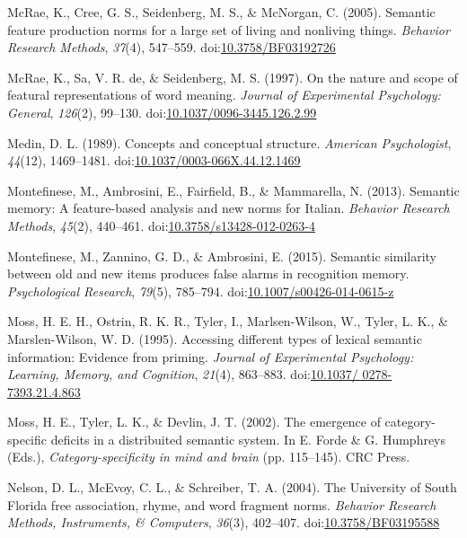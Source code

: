 \documentclass[english,,man]{apa6}
\theoremstyle{definition}
\theoremstyle{definition}
\theoremstyle{definition}
\theoremstyle{remark}
\begin{document}
\leavevmode\hypertarget{ref-McRae2005}{}%
McRae, K., Cree, G. S., Seidenberg, M. S., \& McNorgan, C. (2005).
Semantic feature production norms for a large set of living and
nonliving things. \emph{Behavior Research Methods}, \emph{37}(4),
547--559.
doi:\href{https://doi.org/10.3758/BF03192726}{10.3758/BF03192726}

\leavevmode\hypertarget{ref-McRae1997}{}%
McRae, K., Sa, V. R. de, \& Seidenberg, M. S. (1997). On the nature and
scope of featural representations of word meaning. \emph{Journal of
Experimental Psychology: General}, \emph{126}(2), 99--130.
doi:\href{https://doi.org/10.1037/0096-3445.126.2.99}{10.1037/0096-3445.126.2.99}

\leavevmode\hypertarget{ref-Medin1989}{}%
Medin, D. L. (1989). Concepts and conceptual structure. \emph{American
Psychologist}, \emph{44}(12), 1469--1481.
doi:\href{https://doi.org/10.1037/0003-066X.44.12.1469}{10.1037/0003-066X.44.12.1469}

\leavevmode\hypertarget{ref-Montefinese2013}{}%
Montefinese, M., Ambrosini, E., Fairfield, B., \& Mammarella, N. (2013).
Semantic memory: A feature-based analysis and new norms for Italian.
\emph{Behavior Research Methods}, \emph{45}(2), 440--461.
doi:\href{https://doi.org/10.3758/s13428-012-0263-4}{10.3758/s13428-012-0263-4}

\leavevmode\hypertarget{ref-Montefinese2015}{}%
Montefinese, M., Zannino, G. D., \& Ambrosini, E. (2015). Semantic
similarity between old and new items produces false alarms in
recognition memory. \emph{Psychological Research}, \emph{79}(5),
785--794.
doi:\href{https://doi.org/10.1007/s00426-014-0615-z}{10.1007/s00426-014-0615-z}

\leavevmode\hypertarget{ref-Moss1995}{}%
Moss, H. E. H., Ostrin, R. K. R., Tyler, I., Marlsen-Wilson, W., Tyler,
L. K., \& Marslen-Wilson, W. D. (1995). Accessing different types of
lexical semantic information: Evidence from priming. \emph{Journal of
Experimental Psychology: Learning, Memory, and Cognition}, \emph{21}(4),
863--883.
doi:\href{https://doi.org/10.1037/\%200278-7393.21.4.863}{10.1037/ 0278-7393.21.4.863}

\leavevmode\hypertarget{ref-Moss2002}{}%
Moss, H. E., Tyler, L. K., \& Devlin, J. T. (2002). The emergence of
category-specific deficits in a distribuited semantic system. In E.
Forde \& G. Humphreys (Eds.), \emph{Category-specificity in mind and
brain} (pp. 115--145). CRC Press.

\leavevmode\hypertarget{ref-Nelson2004}{}%
Nelson, D. L., McEvoy, C. L., \& Schreiber, T. A. (2004). The University
of South Florida free association, rhyme, and word fragment norms.
\emph{Behavior Research Methods, Instruments, \& Computers},
\emph{36}(3), 402--407.
doi:\href{https://doi.org/10.3758/BF03195588}{10.3758/BF03195588}
\end{document}
